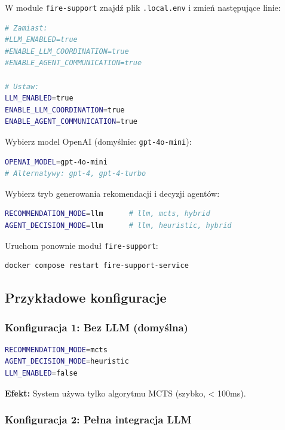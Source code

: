\documentclass[11pt,a4paper]{article}
\begin{document}
W module \texttt{fire-support} znajdź plik \texttt{.local.env} i zmień następujące linie:

\begin{lstlisting}[language=bash, basicstyle=\small]
# Zamiast:
#LLM_ENABLED=true
#ENABLE_LLM_COORDINATION=true
#ENABLE_AGENT_COMMUNICATION=true

# Ustaw:
LLM_ENABLED=true
ENABLE_LLM_COORDINATION=true
ENABLE_AGENT_COMMUNICATION=true
\end{lstlisting}

Wybierz model OpenAI (domyślnie: \texttt{gpt-4o-mini}):

\begin{lstlisting}[language=bash, basicstyle=\small]
OPENAI_MODEL=gpt-4o-mini
# Alternatywy: gpt-4, gpt-4-turbo
\end{lstlisting}

Wybierz tryb generowania rekomendacji i decyzji agentów:

\begin{lstlisting}[language=bash, basicstyle=\small]
RECOMMENDATION_MODE=llm      # llm, mcts, hybrid
AGENT_DECISION_MODE=llm      # llm, heuristic, hybrid
\end{lstlisting}

Uruchom ponownie moduł \texttt{fire-support}:

\begin{lstlisting}[language=bash, basicstyle=\small]
docker compose restart fire-support-service
\end{lstlisting}

\subsection{Przykładowe konfiguracje}

\subsubsection{Konfiguracja 1: Bez LLM (domyślna)}

\begin{lstlisting}[language=bash, basicstyle=\small]
RECOMMENDATION_MODE=mcts
AGENT_DECISION_MODE=heuristic
LLM_ENABLED=false
\end{lstlisting}

\textbf{Efekt:} System używa tylko algorytmu MCTS (szybko, < 100ms).

\subsubsection{Konfiguracja 2: Pełna integracja LLM}
\end{document}
